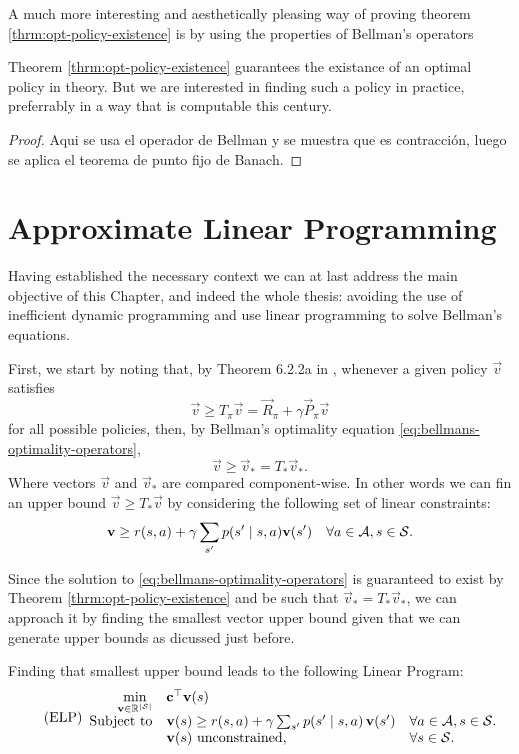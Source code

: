 A much more interesting and aesthetically pleasing way of proving theorem \ref{thrm:opt-policy-existence} is by using the properties of Bellman's operators

Theorem \ref{thrm:opt-policy-existence} guarantees the existance of an optimal policy in theory. But we are interested in finding such a policy in practice, preferrably in a way that is computable this century. 

\begin{proof}
    Aqui se usa el operador de Bellman y se muestra que es contracción, luego se
    aplica el teorema de punto fijo de Banach.
\end{proof}


\section{Approximate Linear Programming}
Having established the necessary context we can at last address the main
objective of this Chapter, and indeed the whole thesis: avoiding the use of
inefficient dynamic programming and use linear programming to solve Bellman's
equations.

First, we start by noting that, by Theorem 6.2.2a in \cite[Ch.~6.9.1]{puterman2014}, whenever a given policy $\vec{v}$ satisfies
\begin{equation*}
    \vec{v} \geq T_\pi \vec{v} = \vec{R}_\pi + \gamma \vec{P}_{\pi} \vec{v}
\end{equation*}
for all possible policies, then, by Bellman's optimality equation
\eqref{eq:bellmans-optimality-operators},
\begin{equation*}
    \vec{v} \geq \vec{v}_* = T_* \vec{v}_*.
\end{equation*}
Where vectors $\vec{v}$ and $\vec{v}_*$ are compared component-wise. In other words we can fin an upper bound $\vec{v} \geq T_{*} \vec{v}$ by considering the following set of linear constraints:
\begin{equation}
    \mathbf{v} \geq r(s, a) + \gamma \sum_{s'} p(s' \mid s, a) \mathbf{v}(s') \quad \forall a \in \mathcal{A}, s \in \mathcal{S}.
\end{equation}

Since the solution to \eqref{eq:bellmans-optimality-operators} is guaranteed to
exist by Theorem \ref{thrm:opt-policy-existence} and be such that $\vec{v}_* =
T_* \vec{v}_*$, we can approach it by finding the smallest vector upper bound
given that we can generate upper bounds as dicussed just before.

Finding that smallest upper bound leads to the following Linear Program:
\begin{equation}
\label{lp:exact-lp}
\tag{ELP}
\begin{array}{rl@{}ll}
    \displaystyle \min_{\vec{v} \in \R^{|\States|}} & \vec{c}^{\top} \vec{v} (s) \\
    \text{Subject to} & \vec{v} (s) \geq r(s,a) + \gamma \sum_{s'} p(s' \mid s, a) \, \vec{v} (s') & \quad \forall a \in \Actions, s \in \States. \\
    & \vec{v}(s) \text{ unconstrained,} & \quad \forall s \in \States.
\end{array}
\end{equation}

